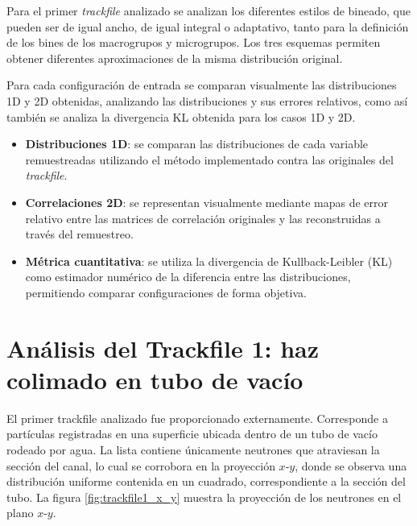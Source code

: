 Para el primer \emph{trackfile} analizado se analizan los diferentes estilos de bineado, que pueden ser de igual ancho, de igual integral o adaptativo, tanto para la definición de los bines de los macrogrupos y microgrupos. Los tres esquemas permiten obtener diferentes aproximaciones de la misma distribución original.

Para cada configuración de entrada se comparan visualmente las distribuciones 1D y 2D obtenidas, analizando las distribuciones y sus errores relativos, como así también se analiza la divergencia KL obtenida para los casos 1D y 2D.

\begin{itemize}
    \item \textbf{Distribuciones 1D}: se comparan las distribuciones de cada variable remuestreadas utilizando el método implementado contra las originales del \emph{trackfile}. 
    \item \textbf{Correlaciones 2D}: se representan visualmente mediante mapas de error relativo entre las matrices de correlación originales y las reconstruidas a través del remuestreo.
    \item \textbf{Métrica cuantitativa}: se utiliza la divergencia de Kullback-Leibler (KL) como estimador numérico de la diferencia entre las distribuciones, permitiendo comparar configuraciones de forma objetiva.
\end{itemize}

\section{Análisis del Trackfile 1: haz colimado en tubo de vacío}

El primer trackfile analizado fue proporcionado externamente. Corresponde a partículas registradas en una superficie ubicada dentro de un tubo de vacío rodeado por agua. La lista contiene únicamente neutrones que atraviesan la sección del canal, lo cual se corrobora en la proyección $x$-$y$, donde se observa una distribución uniforme contenida en un cuadrado, correspondiente a la sección del tubo. La figura \ref{fig:trackfile1_x_y} muestra la proyección de los neutrones en el plano $x$-$y$.

